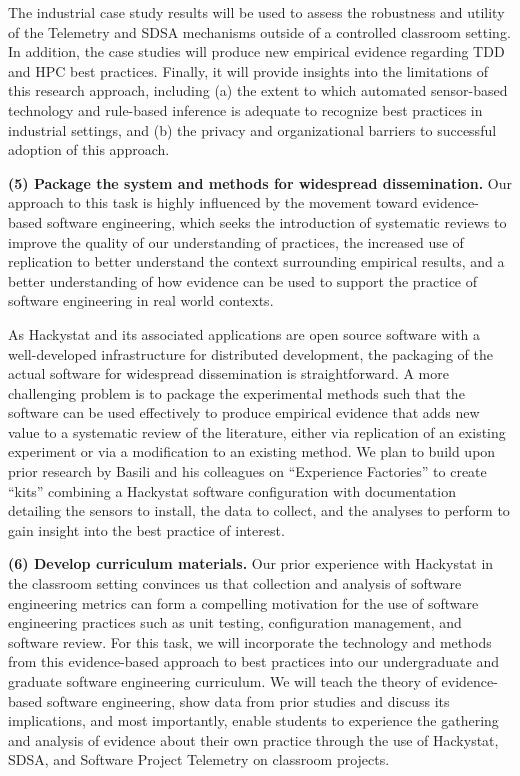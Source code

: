 The industrial case study results will be used to assess the robustness and
utility of the Telemetry and SDSA mechanisms outside of a controlled
classroom setting. In addition, the case studies will produce new empirical
evidence regarding TDD and HPC best practices.  Finally, it will provide
insights into the limitations of this research approach, including (a) the
extent to which automated sensor-based technology and rule-based inference
is adequate to recognize best practices in industrial settings, and (b) the
privacy and organizational barriers to successful adoption of this
approach.

{\bf (5) Package the system and methods for widespread dissemination.} 
Our approach to this task is highly influenced by the movement toward
evidence-based software engineering, which seeks the introduction of
systematic reviews to improve the quality of our understanding of
practices, the increased use of replication to better understand the
context surrounding empirical results, and a better understanding of how 
evidence can be used to support the practice of software engineering in 
real world contexts.   

As Hackystat and its associated applications are open source software with
a well-developed infrastructure for distributed development, the packaging
of the actual software for widespread dissemination is straightforward.  A
more challenging problem is to package the experimental methods such that
the software can be used effectively to produce empirical evidence that
adds new value to a systematic review of the literature, either via
replication of an existing experiment or via a modification to an existing
method.  We plan to build upon prior research by Basili and his colleagues
on ``Experience Factories'' \cite{Basili94} to create ``kits'' combining a
Hackystat software configuration with documentation detailing the sensors
to install, the data to collect, and the analyses to perform to gain
insight into the best practice of interest.

{\bf (6) Develop curriculum materials.}  Our prior experience with
Hackystat in the classroom setting convinces us that collection and
analysis of software engineering metrics can form a compelling motivation
for the use of software engineering practices such as unit testing,
configuration management, and software review.  For this task, we will
incorporate the technology and methods from this evidence-based approach to
best practices into our undergraduate and graduate software engineering
curriculum.  We will teach the theory of evidence-based software
engineering, show data from prior studies and discuss its implications, and
most importantly, enable students to experience the gathering and analysis
of evidence about their own practice through the use of Hackystat, SDSA,
and Software Project Telemetry on classroom projects.


